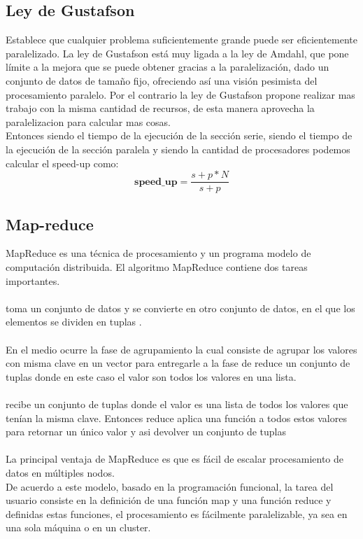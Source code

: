 \subsection{Ley de Gustafson}

Establece que cualquier problema suficientemente grande puede ser eficientemente
paralelizado. La ley de Gustafson está muy ligada a la ley de Amdahl, que pone
límite a la mejora que se puede obtener gracias a la paralelización, dado un
conjunto de datos de tamaño fijo, ofreciendo así una visión pesimista del
procesamiento paralelo. Por el contrario la ley de Gustafson  propone realizar
mas trabajo con la misma cantidad de recursos, de esta manera aprovecha la
paralelizacion para calcular mas cosas.\\

Entonces siendo  el tiempo de la ejecución de la sección serie, siendo
 el tiempo de la ejecución de la sección paralela y siendo  la
cantidad de procesadores podemos calcular el speed-up como:
\begin{equation}
    \textbf{speed\_up} = \dfrac{s+p*N}{s+p}
\end{equation}

\subsection{Map-reduce}

MapReduce es una técnica de procesamiento y un programa modelo de computación
distribuida. El algoritmo MapReduce contiene dos tareas importantes.\\\\
 toma un conjunto de datos y se convierte en otro conjunto de datos, en el
que los elementos se dividen en tuplas .\\\\
En el medio ocurre la fase de agrupamiento la cual consiste de agrupar los valores
con misma clave en un vector para entregarle a la fase de reduce un conjunto de
tuplas  donde en este caso el valor son todos los valores
en una lista.\\\\
 recibe un conjunto de tuplas  donde el valor
es una lista de todos los valores que tenían la misma clave. Entonces reduce
aplica una función a todos estos valores para retornar un único valor y asi
devolver un conjunto de tuplas \\\\
La principal ventaja de MapReduce es que es fácil de escalar procesamiento de
datos en múltiples nodos.\\
De acuerdo a este modelo, basado en la programación funcional, la tarea del
usuario consiste en la definición de una función map y una función reduce y
definidas estas funciones, el procesamiento es fácilmente paralelizable, ya sea
en una sola máquina o en un cluster.\\

